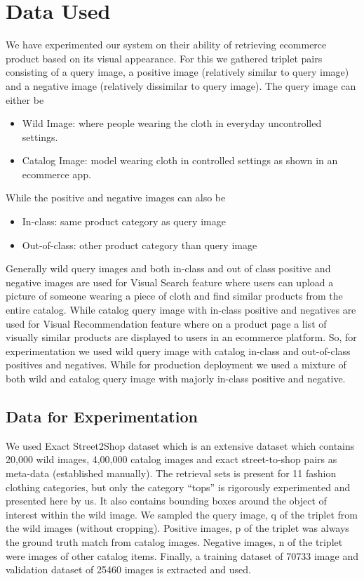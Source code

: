 \documentclass[10pt,twocolumn,letterpaper]{article}
\begin{document}
\vspace{-2mm}
\section{Data Used}
\vspace{-1mm}

We have experimented our system on their ability of retrieving ecommerce product based on its visual appearance. For this we gathered triplet pairs consisting of a query image, a positive image (relatively similar to query image) and a negative image (relatively dissimilar to query image). The query image can either be
\vspace{-1mm}
\begin{itemize}
\item Wild Image: where people wearing the cloth in everyday uncontrolled settings.
\vspace{-2mm}
\item Catalog Image: model wearing cloth in controlled settings as shown in an ecommerce app.
\end{itemize}
While the positive and negative images can also be
\vspace{-1mm}
\begin{itemize}
\item In-class: same product category as query image
\vspace{-2mm}
\item Out-of-class: other product category than query image
\end{itemize}
Generally wild query images and both in-class and out of class positive and negative images are used for Visual Search feature where users can upload a picture of someone wearing a piece of cloth and find similar products from the entire catalog. While catalog query image with in-class positive and negatives are used for Visual Recommendation feature where on a product page a list of visually similar products are displayed to users in an ecommerce platform. So, for experimentation we used wild query image with catalog in-class and out-of-class positives and negatives. While for production deployment we used a mixture of both wild and catalog query image with majorly in-class positive and negative.
\subsection{Data for Experimentation}

We used Exact Street2Shop \cite{c4} dataset which is an extensive dataset which contains 20,000 wild images, 4,00,000 catalog images and exact street-to-shop pairs as meta-data (established manually). The retrieval sets is present for 11 fashion clothing categories, but only the category “tops” is rigorously experimented and presented here by us.  It also contains bounding boxes around the object of interest within the wild image. We sampled the query image, q of the triplet from the wild images (without cropping). Positive images, p of the triplet was always the ground truth match from catalog images. Negative images, n of the triplet were images of other catalog items. Finally, a training dataset of 70733 image and validation dataset of 25460 images is extracted and used.
\end{document}
